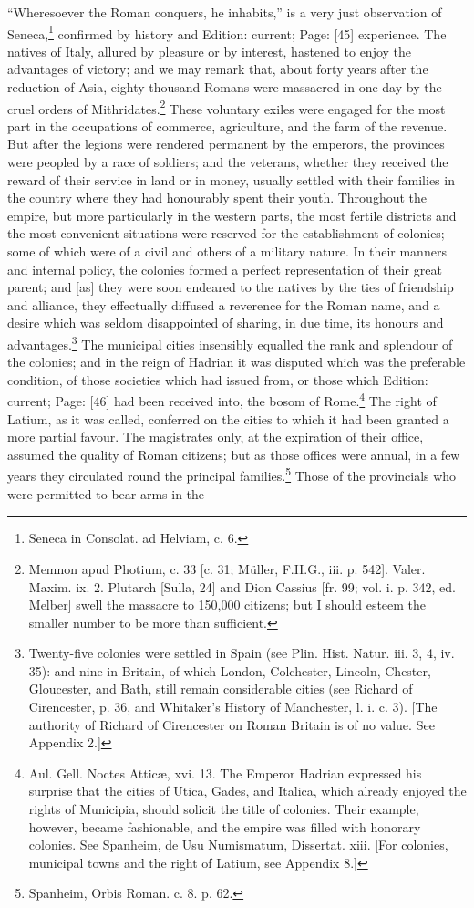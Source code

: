 \texthebrew{“}Wheresoever the Roman conquers, he inhabits,\texthebrew{}” is a very just observation of Seneca,\footnote{Seneca in Consolat. ad Helviam, c. 6.} confirmed by history and Edition: current; Page: [45] experience. The natives of Italy, allured by pleasure or by interest, hastened to enjoy the advantages of victory; and we may remark that, about forty years after the reduction of Asia, eighty thousand Romans were massacred in one day by the cruel orders of Mithridates.\footnote{Memnon apud Photium, c. 33 [c. 31; Müller, F.H.G., iii. p. 542]. Valer. Maxim. ix. 2. Plutarch [Sulla, 24] and Dion Cassius [fr. 99; vol. i. p. 342, ed. Melber] swell the massacre to 150,000 citizens; but I should esteem the smaller number to be more than sufficient.} These voluntary exiles were engaged for the most part in the occupations of commerce, agriculture, and the farm of the revenue. But after the legions were rendered permanent by the emperors, the provinces were peopled by a race of soldiers; and the veterans, whether they received the reward of their service in land or in money, usually settled with their families in the country where they had honourably spent their youth. Throughout the empire, but more particularly in the western parts, the most fertile districts and the most convenient situations were reserved for the establishment of colonies; some of which were of a civil and others of a military nature. In their manners and internal policy, the colonies formed a perfect representation of their great parent; and [as] they were soon endeared to the natives by the ties of friendship and alliance, they effectually diffused a reverence for the Roman name, and a desire which was seldom disappointed of sharing, in due time, its honours and advantages.\footnote{Twenty-five colonies were settled in Spain (see Plin. Hist. Natur. iii. 3, 4, iv. 35): and nine in Britain, of which London, Colchester, Lincoln, Chester, Gloucester, and Bath, still remain considerable cities (see Richard of Cirencester, p. 36, and Whitaker\texthebrew{}’s History of Manchester, l. i. c. 3). [The authority of Richard of Cirencester on Roman Britain is of no value. See Appendix 2.]} The municipal cities insensibly equalled the rank and splendour of the colonies; and in the reign of Hadrian it was disputed which was the preferable condition, of those societies which had issued from, or those which Edition: current; Page: [46] had been received into, the bosom of Rome.\footnote{Aul. Gell. Noctes Atticæ, xvi. 13. The Emperor Hadrian expressed his surprise that the cities of Utica, Gades, and Italica, which already enjoyed the rights of Municipia, should solicit the title of colonies. Their example, however, became fashionable, and the empire was filled with honorary colonies. See Spanheim, de Usu Numismatum, Dissertat. xiii. [For colonies, municipal towns and the right of Latium, see Appendix 8.]} The right of Latium, as it was called, conferred on the cities to which it had been granted a more partial favour. The magistrates only, at the expiration of their office, assumed the quality of Roman citizens; but as those offices were annual, in a few years they circulated round the principal families.\footnote{Spanheim, Orbis Roman. c. 8. p. 62.} Those of the provincials who were permitted to bear arms in the 